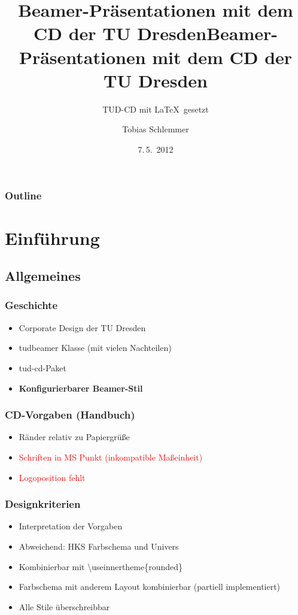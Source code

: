 \documentclass[presentation,t]{beamer}
\title{Beamer-Präsentationen mit dem CD der TU Dresden}
\author{Tobias Schlemmer}
\date{7.\,5.~2012}
\title[TUD-CD mit \LaTeX\ gesetzt]{Beamer-Präsentationen mit dem CD der TU Dresden}
\subtitle{TUD-CD mit \LaTeX\ gesetzt}
\providecommand{\alert}[1]{\textbf{#1}}
\begin{document}
\maketitle

\begin{frame}
\frametitle{Outline}
\setcounter{tocdepth}{3}
\tableofcontents
\end{frame}
\section{Einführung}
\label{sec-1}
\subsection{Allgemeines}
\label{sec-1-1}
\begin{frame}
\frametitle{Geschichte}
\label{sec-1-1-1}

\begin{itemize}
\item Corporate Design der TU Dresden
\item tudbeamer Klasse (mit vielen Nachteilen)
\item tud-cd-Paket
\item \alert{Konfigurierbarer Beamer-Stil}
\end{itemize}
\end{frame}
\begin{frame}
\frametitle{CD-Vorgaben (Handbuch)}
\label{sec-1-1-2}

\begin{itemize}
\item \textcolor{HKS65K100}{Ränder relativ zu Papiergrüße}
\item \textcolor{red}{Schriften in MS Punkt (inkompatible Maßeinheit)}
\item \textcolor{red}{Logoposition fehlt}
\end{itemize}
\end{frame}
\begin{frame}
\frametitle{Designkriterien}
\label{sec-1-1-3}

\begin{itemize}
\item Interpretation der Vorgaben
\item Abweichend: HKS Farbschema und Univers
\item Kombinierbar mit \textbackslash useinnertheme\{rounded\}
\item Farbschema mit anderem Layout kombinierbar (partiell implementiert)
\item Alle Stile überschreibbar
\end{itemize}
\end{frame}
\end{document}

